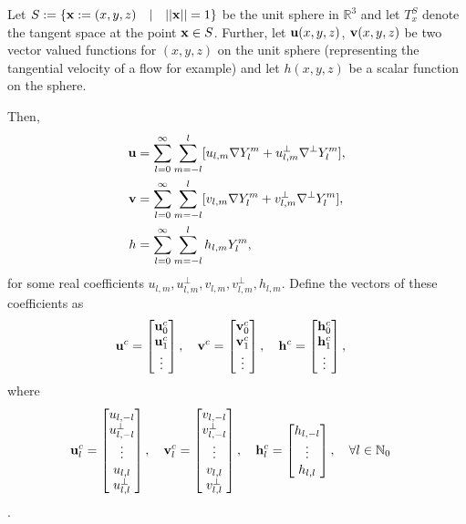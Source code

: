 \documentclass[11pt, oneside]{article}   	%
\newcommand{\R}{\mathbb{R}}
\newcommand{\No}{\mathbb{N}_0}
\newcommand{\Ylm}{Y^m_l}
\newcommand{\gradYlm}{\nabla Y^m_l}
\newcommand{\gradpYlm}{\nabla^\perp Y^m_l}
\begin{document}
Let \(S := \{ \bold{x} := (x,y,z) \quad | \quad ||\bold{x}|| = 1\}\) be the unit sphere in \(\R^3\) and let \(T_x^S\) denote the tangent space at the point \(\bold{x} \in S\). Further, let \(\bold{u}(x,y,z)\), \(\bold{v}(x,y,z)\) be two vector valued functions for \((x,y,z)\) on the unit sphere (representing the tangential velocity of a flow for example) and let \(h(x,y,z)\) be a scalar function on the sphere.

Then, 
\begin{align}
\bold{u} &= \sum_{l=0}^{\infty} \sum_{m=-l}^{l} [ u_{l,m} \gradYlm + u^{\perp}_{l,m} \gradpYlm ], \\
\bold{v} &= \sum_{l=0}^{\infty} \sum_{m=-l}^{l} [ v_{l,m} \gradYlm + v^{\perp}_{l,m} \gradpYlm ], \\
h &= \sum_{l=0}^{\infty} \sum_{m=-l}^{l} h_{l,m} \Ylm,
\end{align}
for some real coefficients \(u_{l,m}, u^{\perp}_{l,m}, v_{l,m}, v^{\perp}_{l,m}, h_{l,m}\). Define the vectors of these coefficients as 
\begin{align}
\bold{u}^c &= \begin{bmatrix}
			\bold{u}_0^c \\
			\bold{u}_1^c \\
			\vdots \\
		    \end{bmatrix},
\quad
\bold{v}^c = \begin{bmatrix}
			\bold{v}_0^c \\
			\bold{v}_1^c \\
			\vdots \\
		    \end{bmatrix},
\quad
\bold{h}^c = \begin{bmatrix}
			\bold{h}_0^c \\
			\bold{h}_1^c \\
			\vdots \\
		    \end{bmatrix},		  
\end{align}
where
\begin{align}
\bold{u}^c_l &= \begin{bmatrix}
				u_{l,-l} \\
				u^{\perp}_{l,-l} \\
				\vdots \\
				u_{l,l} \\
				u^{\perp}_{l,l}
		        \end{bmatrix},
\quad
\bold{v}^c_l = \begin{bmatrix}
				v_{l,-l} \\
				v^{\perp}_{l,-l} \\
				\vdots \\
				v_{l,l} \\
				v^{\perp}_{l,l}
		        \end{bmatrix},
\quad
\bold{h}^c_l = \begin{bmatrix}
				h_{l,-l} \\
				\vdots \\
				h_{l,l} \\
		        \end{bmatrix},
\quad \forall l \in \No	  
\end{align}.
\end{document}
